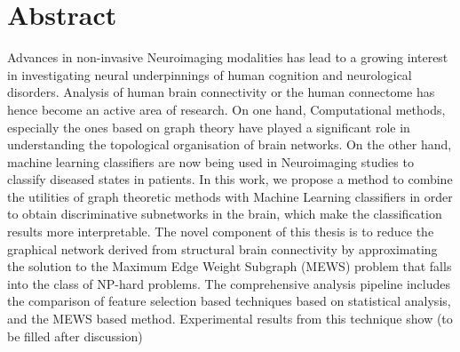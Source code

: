 \documentclass[msthesis.tex]{subfiles}
\begin{document}
\chapter{Abstract}
\thispagestyle{empty}

Advances in non-invasive Neuroimaging modalities has lead to a growing interest in investigating neural underpinnings of human cognition and neurological disorders. Analysis of human brain connectivity or the human connectome has hence become an active area of research. On one hand, Computational methods, especially the ones based on graph theory have played a significant role in understanding the topological organisation of brain networks. On the other hand, machine learning classifiers are now being used in Neuroimaging studies to classify diseased states in patients. In this work, we propose a method to combine the utilities of graph theoretic methods with Machine Learning classifiers in order to obtain discriminative subnetworks in the brain, which make the classification results more interpretable. The novel component of this thesis is to reduce the graphical network derived from structural brain connectivity by approximating the solution to the Maximum Edge Weight Subgraph (MEWS) problem that falls into the class of NP-hard problems. The comprehensive analysis pipeline includes the comparison of feature selection based techniques based on statistical analysis, and the MEWS based method. Experimental results from this technique show (to be filled after discussion)
\end{document}
